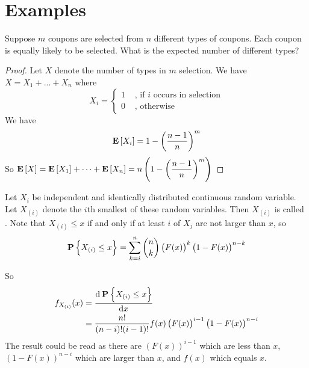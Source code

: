 \chapter{Examples}



\begin{example}
    Suppose $m$ coupons are selected from $n$ different types of coupons. Each coupon is equally likely to be selected. What is the expected number of different types?
\end{example}

\begin{proof}
    Let $X$ denote the number of types in $m$ selection. We have $X = X_1 + ... + X_n$ where
    \begin{equation*}
        X_i = \begin{cases}
            1 & \text{ , if } i \text{ occurs in selection} \\
            0 & \text{ , otherwise}
        \end{cases}
    \end{equation*}
    We have 
    \begin{equation*}
        \mathop{\bf E\/}\displaystyle \left[ X_i \right] = 1 - \left(\frac{n - 1}{n} \right)^m
    \end{equation*}
    So $\mathop{\bf E\/}\displaystyle \left[ X \right] = \mathop{\bf E\/}\displaystyle \left[ X_1 \right] + \dots + \mathop{\bf E\/}\displaystyle \left[ X_n \right] = \displaystyle n \left(1 - \left(\frac{n - 1}{n} \right)^m \right)$
\end{proof}

\begin{example}
    Let $X_i$ be independent and identically distributed continuous random variable. Let $X_{(i)}$ denote the $i$th smallest of these random variables. Then $X_{(i)}$ is called . Note that $X_{(i)} \leq x$ if and only if at least $i$ of $X_j$ are not larger than $x$, so
    \begin{equation*}
        \mathop{\bf P\/}\displaystyle \left\{X_{(i)} \leq x\right\} = \sum_{k=i}^n \binom{n}{k} \left(F(x) \right)^k \left(1 - F(x) \right)^{n-k}
    \end{equation*}
    
    So
    \begin{equation*}
        \begin{aligned}
            f_{X_{(i)}} (x) &= \dod{\probability{X_{(i)} \leq x}}{x} \\
            &= \frac{n!}{(n-i)!(i-1)!} f(x) \left( F(x) \right)^{i-1} \left(1-F(x) \right)^{n-i}
        \end{aligned}
    \end{equation*}
    The result could be read as there are $\left( F(x) \right)^{i-1}$ which are less than $x$, $\left(1-F(x) \right)^{n-i}$ which are larger than $x$, and $f(x)$ which equals $x$.
\end{example}

